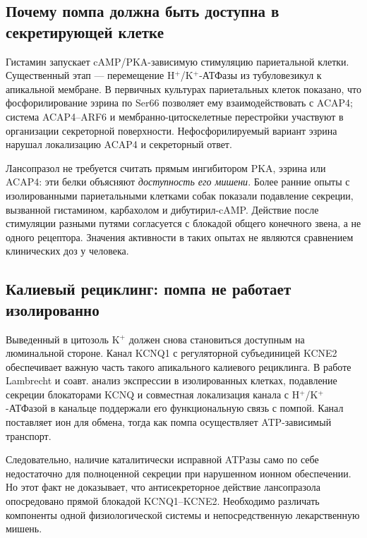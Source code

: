 \documentclass[11pt,a4paper,notitlepage]{report}
\newcommand{\src}[1]{\unskip\space\cite{#1}}
\begin{document}
\subsection{Почему помпа должна быть доступна в секретирующей клетке}
Гистамин запускает cAMP/PKA-зависимую стимуляцию париетальной клетки. Существенный этап --- перемещение H$^+$/K$^+$-АТФазы из тубуловезикул к апикальной мембране. В первичных культурах париетальных клеток показано, что фосфорилирование эзрина по Ser66 позволяет ему взаимодействовать с ACAP4; система ACAP4--ARF6 и мембранно-цитоскелетные перестройки участвуют в организации секреторной поверхности. Нефосфорилируемый вариант эзрина нарушал локализацию ACAP4 и секреторный ответ.\src{molezrin}

Лансопразол не требуется считать прямым ингибитором PKA, эзрина или ACAP4: эти белки объясняют \emph{доступность его мишени}. Более ранние опыты с изолированными париетальными клетками собак показали подавление секреции, вызванной гистамином, карбахолом и дибутирил-cAMP. Действие после стимуляции разными путями согласуется с блокадой общего конечного звена, а не одного рецептора. Значения активности в таких опытах не являются сравнением клинических доз у человека.\src{molnagaya90}

\subsection{Калиевый рециклинг: помпа не работает изолированно}
Выведенный в цитозоль K$^+$ должен снова становиться доступным на люминальной стороне. Канал KCNQ1 с регуляторной субъединицей KCNE2 обеспечивает важную часть такого апикального калиевого рециклинга. В работе Lambrecht и соавт. анализ экспрессии в изолированных клетках, подавление секреции блокаторами KCNQ и совместная локализация канала с H$^+$/K$^+$-АТФазой в канальце поддержали его функциональную связь с помпой. Канал поставляет ион для обмена, тогда как помпа осуществляет ATP-зависимый транспорт.\src{molkchannel}

Следовательно, наличие каталитически исправной ATPазы само по себе недостаточно для полноценной секреции при нарушенном ионном обеспечении. Но этот факт не доказывает, что антисекреторное действие лансопразола опосредовано прямой блокадой KCNQ1--KCNE2. Необходимо различать компоненты одной физиологической системы и непосредственную лекарственную мишень.\src{molkchannel,molcys}
\end{document}
